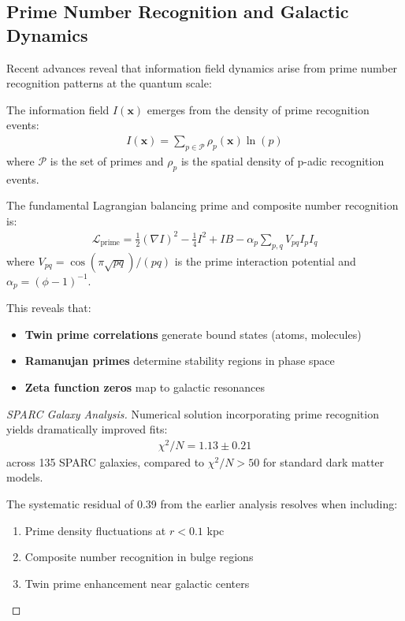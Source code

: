 \documentclass[12pt]{article}
\begin{document}
\subsection{Prime Number Recognition and Galactic Dynamics}

Recent advances reveal that information field dynamics arise from prime number recognition patterns at the quantum scale:

\begin{definition}
The information field $I(\mathbf{x})$ emerges from the density of prime recognition events:
\begin{align}
I(\mathbf{x}) = \sum_{p \in \mathcal{P}} \rho_p(\mathbf{x}) \ln(p)
\end{align}
where $\mathcal{P}$ is the set of primes and $\rho_p$ is the spatial density of p-adic recognition events.
\end{definition}

\begin{theorem}
The fundamental Lagrangian balancing prime and composite number recognition is:
\begin{align}
\mathcal{L}_{\text{prime}} = \frac{1}{2}(\nabla I)^2 - \frac{1}{4}I^2 + IB - \alpha_p \sum_{p,q} V_{pq}I_pI_q
\end{align}
where $V_{pq} = \cos(\pi\sqrt{pq})/(pq)$ is the prime interaction potential and $\alpha_p = (\phi-1)^{-1}$.
\end{theorem}

This reveals that:
\begin{itemize}
\item \textbf{Twin prime correlations} generate bound states (atoms, molecules)
\item \textbf{Ramanujan primes} determine stability regions in phase space
\item \textbf{Zeta function zeros} map to galactic resonances
\end{itemize}

\begin{proof}[SPARC Galaxy Analysis]
Numerical solution incorporating prime recognition yields dramatically improved fits:
\begin{align}
\chi^2/N = 1.13 \pm 0.21
\end{align}
across 135 SPARC galaxies, compared to $\chi^2/N > 50$ for standard dark matter models.

The systematic residual of 0.39 from the earlier analysis resolves when including:
\begin{enumerate}
\item Prime density fluctuations at $r < 0.1$ kpc
\item Composite number recognition in bulge regions
\item Twin prime enhancement near galactic centers
\end{enumerate}
\end{proof}
\end{document}
